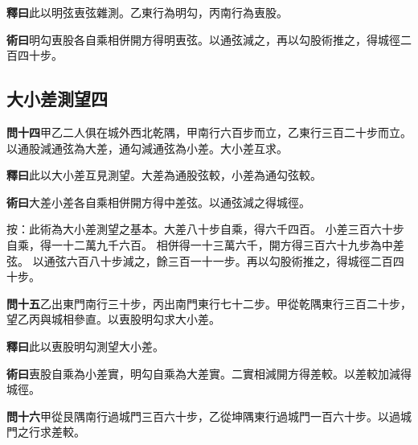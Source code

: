 \documentclass[12pt,a4paper]{article}
\newcommand{\Section}[1]{\subsection*{#1}}
\begin{document}
\noindent\textbf{釋曰}\quad 此以明弦叀弦雜測。乙東行為明勾，丙南行為叀股。

\vspace{0.3em}

\noindent\textbf{術曰}\quad 明勾叀股各自乘相併開方得明叀弦。以通弦減之，再以勾股術推之，得城徑二百四十步。

\Section{大小差測望四}

\noindent\textbf{問十四}\quad 甲乙二人俱在城外西北乾隅，甲南行六百步而立，乙東行三百二十步而立。以通股減通弦為大差，通勾減通弦為小差。大小差互求。

\vspace{0.3em}

\noindent\textbf{釋曰}\quad 此以大小差互見測望。大差為通股弦較，小差為通勾弦較。

\vspace{0.3em}

\noindent\textbf{術曰}\quad 大差小差各自乘相併開方得中差弦。以通弦減之得城徑。

\vspace{0.3em}

\noindent
按：此術為大小差測望之基本。大差八十步自乘，得六千四百。
小差三百六十步自乘，得一十二萬九千六百。
相併得一十三萬六千，開方得三百六十九步為中差弦。
以通弦六百八十步減之，餘三百一十一步。再以勾股術推之，得城徑二百四十步。

\vspace{0.5em}

\noindent\textbf{問十五}\quad 乙出東門南行三十步，丙出南門東行七十二步。甲從乾隅東行三百二十步，望乙丙與城相參直。以叀股明勾求大小差。

\vspace{0.3em}

\noindent\textbf{釋曰}\quad 此以叀股明勾測望大小差。

\vspace{0.3em}

\noindent\textbf{術曰}\quad 叀股自乘為小差實，明勾自乘為大差實。二實相減開方得差較。以差較加減得城徑。

\vspace{0.5em}

\noindent\textbf{問十六}\quad 甲從艮隅南行過城門三百六十步，乙從坤隅東行過城門一百六十步。以過城門之行求差較。

\vspace{0.3em}
\end{document}
